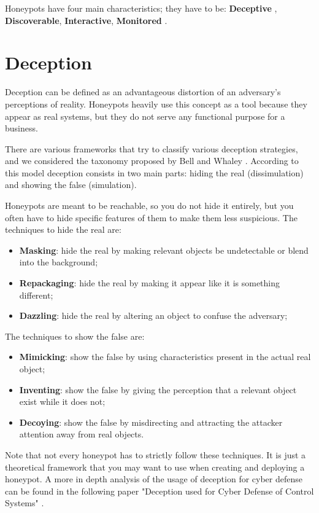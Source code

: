 \documentclass[epsfig,a4paper,11pt,titlepage,oneside,openany]{book}
\begin{document}
Honeypots have four main characteristics; they have to be: \textbf{Deceptive} , \textbf{Discoverable}, \textbf{Interactive}, \textbf{Monitored} \cite{sanders2020intrusion}.

\section{Deception}

Deception can be defined as an advantageous distortion of an adversary's perceptions of reality. Honeypots heavily use this concept as a tool because they appear as real systems, but they do not serve any functional purpose for a business.

There are various frameworks that try to classify various deception strategies, and we considered the taxonomy proposed by Bell and Whaley \cite{Whaley}. According to this model deception consists in two main parts: hiding the real (dissimulation) and showing the false (simulation).

Honeypots are meant to be reachable, so you do not hide it entirely, but you often have to hide specific features of them to make them less suspicious.
The techniques to hide the real are:
\begin{itemize}
\itemsep0em 
\item \textbf{Masking}: hide the  real by making relevant objects be undetectable or blend into the background;
\item \textbf{Repackaging}: hide the  real by making it appear like it is something different;
\item \textbf{Dazzling}: hide the real by altering an object to confuse the adversary;
\end{itemize}

The techniques to show the false are:
\begin{itemize}
\itemsep0em 
\item \textbf{Mimicking}: show the false by using characteristics present in the actual real object;
\item \textbf{Inventing}: show the false by giving the perception that a relevant object exist while it does not; 
\item \textbf{Decoying}: show the false by misdirecting and attracting the attacker attention away from real objects.
\end{itemize}
Note that not every honeypot has to strictly follow these techniques. It is just a theoretical framework that you may want to use when creating and deploying a honeypot. 
A more in depth analysis of the usage of deception for cyber defense can be found in the following paper "Deception used for Cyber Defense of  Control Systems" \cite{deception_defense}.
\end{document}
